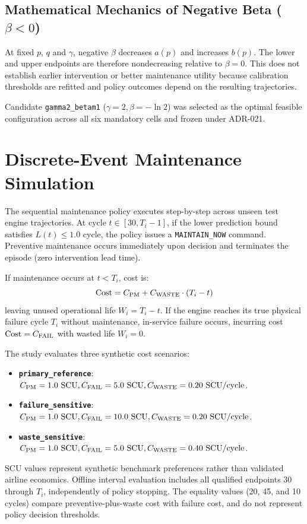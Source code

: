 \subsection{Mathematical Mechanics of Negative Beta ($\beta < 0$)}
At fixed $p$, $q$ and $\gamma$, negative $\beta$ decreases $a(p)$ and increases $b(p)$. The lower and upper endpoints are therefore nondecreasing relative to $\beta=0$. This does not establish earlier intervention or better maintenance utility because calibration thresholds are refitted and policy outcomes depend on the resulting trajectories.

Candidate \texttt{gamma2\_betam1} ($\gamma=2, \beta=-\ln 2$) was selected as the optimal feasible configuration across all six mandatory cells and frozen under ADR-021.

\section{Discrete-Event Maintenance Simulation}
The sequential maintenance policy executes step-by-step across unseen test engine trajectories. At cycle $t \in [30, T_i - 1]$, if the lower prediction bound satisfies $L(t) \le 1.0$ cycle, the policy issues a \texttt{MAINTAIN\_NOW} command. Preventive maintenance occurs immediately upon decision and terminates the episode (zero intervention lead time).

If maintenance occurs at $t < T_i$, cost is:
\begin{equation}
\text{Cost} = C_{\text{PM}} + C_{\text{WASTE}} \cdot (T_i - t)
\end{equation}
leaving unused operational life $W_i = T_i - t$. If the engine reaches its true physical failure cycle $T_i$ without maintenance, in-service failure occurs, incurring cost $\text{Cost} = C_{\text{FAIL}}$ with wasted life $W_i = 0$.

The study evaluates three synthetic cost scenarios:
\begin{itemize}
    \item \textbf{\texttt{primary\_reference}}: $C_{\text{PM}} = 1.0~\text{SCU}, C_{\text{FAIL}} = 5.0~\text{SCU}, C_{\text{WASTE}} = 0.20~\text{SCU}/\text{cycle}$.
    \item \textbf{\texttt{failure\_sensitive}}: $C_{\text{PM}} = 1.0~\text{SCU}, C_{\text{FAIL}} = 10.0~\text{SCU}, C_{\text{WASTE}} = 0.20~\text{SCU}/\text{cycle}$.
    \item \textbf{\texttt{waste\_sensitive}}: $C_{\text{PM}} = 1.0~\text{SCU}, C_{\text{FAIL}} = 5.0~\text{SCU}, C_{\text{WASTE}} = 0.40~\text{SCU}/\text{cycle}$.
\end{itemize}
SCU values represent synthetic benchmark preferences rather than validated airline economics. Offline interval evaluation includes all qualified endpoints $30$ through $T_i$, independently of policy stopping. The equality values (20, 45, and 10 cycles) compare preventive-plus-waste cost with failure cost, and do not represent policy decision thresholds.
